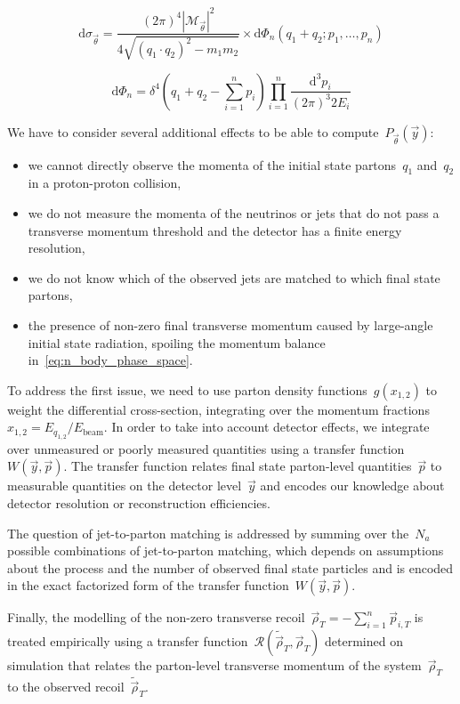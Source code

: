 \begin{equation}
\label{eq:diff_cross_section}
\mathrm{d}\sigma_{\vec{\theta}} = \frac{(2\pi)^4 |\mathcal{M}_{\vec{\theta}}|^2}{4 \sqrt{(q_1 \cdot q_2)^2 - m_1 m_2}} \times
\mathrm{d}\Phi_n(q_1 + q_2; p_1, \dots, p_{n})
\end{equation}

\begin{equation}
\label{eq:n_body_phase_space}
\mathrm{d}\Phi_n = \delta^4 (q_1 + q_2 - \sum_{i=1}^n p_i) \prod_{i=1}^n \frac{\mathrm{d}^3 p_i}{(2\pi)^3 2 E_i}
\end{equation}

We have to consider several additional effects to be able to compute~$P_{\vec{\theta}}(\vec{y})$:
\begin{itemize}
\item we cannot directly observe the momenta of the initial state partons~$q_1$ and~$q_2$ in a proton-proton collision,
\item we do not measure the momenta of the neutrinos or jets that do not pass a transverse momentum threshold and the detector has a finite energy resolution,
\item we do not know which of the observed jets are matched to which final state partons,
\item the presence of non-zero final transverse momentum caused by large-angle initial state radiation, spoiling the momentum balance in~\cref{eq:n_body_phase_space}.
\end{itemize}

To address the first issue, we need to use parton density functions~$g(x_{1,2})$ to weight the differential cross-section, integrating over the momentum fractions~$x_{1,2} = E_{q_{1,2}}/E_{\mathrm{beam}}$.
In order to take into account detector effects, we integrate over unmeasured or poorly measured quantities using a transfer function~$W(\vec{y}, \vec{p})$.
The transfer function relates final state parton-level quantities~$\vec{p}$ to measurable quantities on the detector level~$\vec{y}$ and encodes our knowledge about detector resolution or reconstruction efficiencies.

The question of jet-to-parton matching is addressed by summing over the~$N_a$ possible combinations of jet-to-parton matching, which depends on assumptions about the process and the number of observed final state particles and is encoded in the exact factorized form of the transfer function~$W(\vec{y}, \vec{p})$.

Finally, the modelling of the non-zero transverse recoil~$\vec{\rho}_T = -\sum_{i=1}^n \vec{p}_{i,T}$ is treated empirically using a transfer function~$\mathcal{R}(\tilde{\vec{\rho}}_T, \vec{\rho}_T)$ determined on simulation that relates the parton-level transverse momentum of the system~$\vec{\rho}_T$ to the observed recoil~$\tilde{\vec{\rho}}_T$. 

